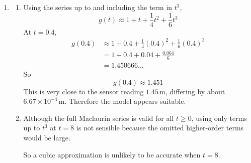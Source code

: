 \documentclass[leqno]{article}
\begin{document}
\begin{enumerate}[
  label=\textbf{\arabic*.},
  leftmargin=*,
  topsep=0pt,
  partopsep=0pt,
  parsep=0pt
]
\begin{tcolorbox}[colback=white, colframe=scarlet, title={\textbf{Solution}}, breakable, grow to left by=6mm, grow to right by=10mm]
\begin{enumerate}[label=\textbf{(\alph*)}]
\begin{enumerate}[label=(\roman*)]
    \item For $x=g(t)$, the differential equation is
    \[
    4(t+1)-g-2\frac{\mathrm{d}g}{\mathrm{d}t}=2\frac{\mathrm{d}^2g}{\mathrm{d}t^2}
    \]
    Differentiate both sides with respect to $t$:
    \[
    4-\frac{\mathrm{d}g}{\mathrm{d}t}-2\frac{\mathrm{d}^2g}{\mathrm{d}t^2}
    =2\frac{\mathrm{d}^3g}{\mathrm{d}t^3}
    \]
    Now substitute $t=0$.

    From earlier parts,
    \[
    \frac{\mathrm{d}g}{\mathrm{d}t}(0)=1,
    \qquad
    \frac{\mathrm{d}^2g}{\mathrm{d}t^2}(0)=\frac12
    \]
    So
    \begin{align*}
    4-1-2\left(\frac12\right)&=2\frac{\mathrm{d}^3g}{\mathrm{d}t^3}(0)\\
    4-1-1&=2\frac{\mathrm{d}^3g}{\mathrm{d}t^3}(0)\\
    2&=2\frac{\mathrm{d}^3g}{\mathrm{d}t^3}(0)
    \end{align*}
    Hence
    \[
    \frac{\mathrm{d}^3g}{\mathrm{d}t^3}(0)=1
    \]
    The $t^3$ term in the Maclaurin series is therefore
    \[
    \frac{1}{3!}\frac{\mathrm{d}^3g}{\mathrm{d}t^3}(0)t^3
    =\frac{1}{6}\cdot 1 \cdot t^3
    =\frac16 t^3
    \]
    So the term in $t^3$ is $\frac16 t^3$.
  \end{enumerate}

  \item
  \begin{enumerate}[label=(\roman*)]
    \item Using the series up to and including the term in $t^3$,
    \[
    g(t)\approx 1+t+\frac14 t^2+\frac16 t^3
    \]
    At $t=0.4$,
    \begin{align*}
    g(0.4)&\approx 1+0.4+\frac14(0.4)^2+\frac16(0.4)^3\\
    &=1+0.4+0.04+\frac{0.064}{6}\\
    &=1.450666\ldots
    \end{align*}
    So
    \[
    g(0.4)\approx 1.451
    \]
    This is very close to the sensor reading $1.45\,\text{m}$, differing by about $6.67\times10^{-4}\,\text{m}$. Therefore the model appears suitable.

    \item Although the full Maclaurin series is valid for all $t\ge 0$, using only terms up to $t^3$ at $t=8$ is not sensible because the omitted higher-order terms would be large.

    So a cubic approximation is unlikely to be accurate when $t=8$.
  \end{enumerate}
\end{enumerate}
\end{tcolorbox}

\end{enumerate}
\end{document}
